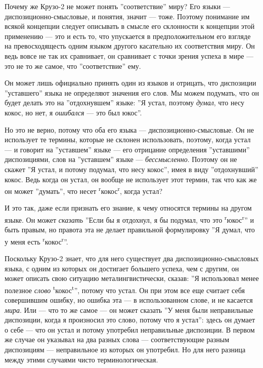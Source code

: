 \documentclass[11pt]{book}
\begin{document}
Почему же Крузо-2 не может понять ''соответствие'' миру? Его языки --- диспозиционно-смысловые, и понятия, значит --- тоже. Поэтому понимание им всякой концепции следует описывать в смысле его склонности к концепции этой применению --- это и есть то, что упускается в предположительном его взгляде на превосходящесть одним языком другого касательно их соответствия миру. Он ведь вовсе не так их сравнивает, он сравнивает с точки зрения успеха в мире --- это не то же самое, что ''соответствие'' ему.

Он может лишь официально принять один из языков и отрицать, что диспозиции ''уставшего'' языка не определяют значения его слов. Мы можем подумать, что он будет делать это на ''отдохнувшем'' языке: ''Я устал, поэтому \textit{думал}, что несу кокос, но нет, я \textit{ошибался} --- это был юкос''.

Но это не верно, потому что оба его языка --- диспозиционно-смысловые. Он не использует те термины, которые не склонен использовать, поэтому, когда устал --- и говорит на ''уставшем'' языке --- его отрицание определения ''уставшими'' диспозициями, слов на ''уставшем'' языке --- \textit{бессмысленно}. Поэтому он не скажет ''Я устал, и потому подумал, что несу кокос'', имея в виду ''отдохнувший'' кокос. Ведь когда он устал, он вообще не использует этот термин, так что как же он может ''думать'', что несет \textsuperscript{r}кокос\textsuperscript{r}, когда устал?

И это так, даже если признать его знание, к чему относятся термины на другом языке. Он может \textit{сказать} ''Если бы я отдохнул, я бы подумал, что это \textsuperscript{r}юкос\textsuperscript{r}'' и быть правым, но правота эта не делает правильной формулировку ''Я думал, что у меня есть \textsuperscript{r}кокос\textsuperscript{r}''.

Поскольку Крузо-2 знает, что для него существует два диспозиционно-смысловых языка, с одним из которых он достигает большего успеха, чем с другим, он может описать свою ситуацию металингвистически, сказав: ''Я использовал менее полезное \textit{слово} \textsuperscript{t}кокос\textsuperscript{t}'', потому что устал. Он при этом все еще считает себя совершившим ошибку, но ошибка эта --- в использованном слове, и не касается \textit{мира}. Или --- что то же самое --- он может сказать ''У меня были неправильные диспозиции, когда я произносил это слово, потому что я устал'': здесь он думает о себе --- что он устал и потому употребил неправильные диспозиции. В первом же случае он указывал на два разных слова --- соответствующие разным диспозициям --- неправильное из которых он употребил. Но для него разница между этими случаями чисто терминологическая.
\end{document}
